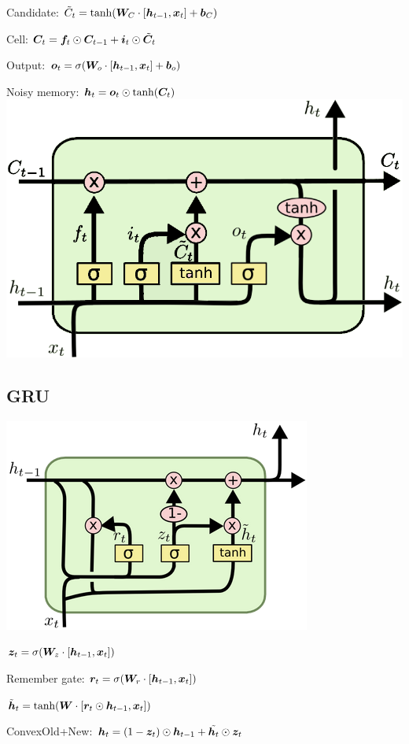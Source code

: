 Candidate: $\tilde{C}_t=\tanh(\boldsymbol{W}_C\cdot [\boldsymbol{h}_{t-1},\boldsymbol{x}_t]+\boldsymbol{b}_C)$

Cell: $\boldsymbol{C}_t=\boldsymbol{f}_t\odot \boldsymbol{C}_{t-1}+\boldsymbol{i}_t\odot\tilde{\boldsymbol{C}}_t$

Output: $\boldsymbol{o}_t= \sigma(\boldsymbol{W}_o\cdot[\boldsymbol{h}_{t-1},\boldsymbol{x}_t]+\boldsymbol{b}_o)$

Noisy memory: $\boldsymbol{h}_t=\boldsymbol{o}_t\odot \tanh(\boldsymbol{C}_t)$
\includegraphics[width=\textwidth/5
]{ETH-DS-2020/AML/Resources/lstm_edited.png}
\subsection*{GRU}
\begin{multicols}{2}
\includegraphics[width=\textwidth/8
]{ETH-DS-2020/AML/Resources/GRU.png}

$\boldsymbol{z}_t= \sigma(\boldsymbol{W}_z\cdot[\boldsymbol{h}_{t-1},\boldsymbol{x}_t])$

Remember gate: $\boldsymbol{r}_t= \sigma(\boldsymbol{W}_r\cdot[\boldsymbol{h}_{t-1},\boldsymbol{x}_t])$

$\tilde{\boldsymbol{h}}_t= \tanh(\boldsymbol{W}\cdot[\boldsymbol{r}_t\odot\boldsymbol{h}_{t-1},\boldsymbol{x}_t])$

ConvexOld+New: $\boldsymbol{h}_t=(1-\boldsymbol{z}_t)\odot\boldsymbol{h}_{t-1}
+\tilde{\boldsymbol{h}_t}\odot\boldsymbol{z}_t$
\end{multicols}

